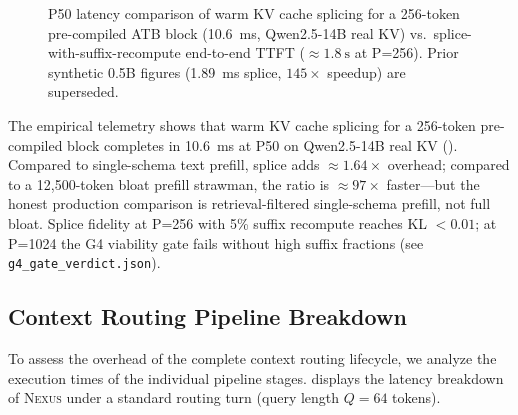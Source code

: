 \documentclass[conference,10pt]{IEEEtran}
\newcommand{\Nexus}{\textsc{Nexus}\xspace}
\begin{document}
\begin{figure}[h]
\centering
{}
\caption{P50 latency comparison of warm KV cache splicing for a 256-token pre-compiled ATB block (\SI{10.6}{\milli\second}, Qwen2.5-14B real KV) vs.\ splice-with-suffix-recompute end-to-end TTFT (\(\approx\!\SI{1.8}{\second}\) at P=256). Prior synthetic 0.5B figures (\SI{1.89}{\milli\second} splice, $145\times$ speedup) are superseded.}
\label{fig:latency_chart}
\end{figure}

The empirical telemetry shows that warm KV cache splicing for a 256-token pre-compiled block completes in \SI{10.6}{\milli\second} at P50 on Qwen2.5-14B real KV (). Compared to single-schema text prefill, splice adds \(\approx\!1.64\times\) overhead; compared to a 12,500-token bloat prefill strawman, the ratio is \(\approx\!97\times\) faster---but the honest production comparison is retrieval-filtered single-schema prefill, not full bloat. Splice fidelity at P=256 with 5\% suffix recompute reaches KL $<0.01$; at P=1024 the G4 viability gate fails without high suffix fractions (see \texttt{g4\_gate\_verdict.json}).

\subsection{Context Routing Pipeline Breakdown}
\label{subsec:eval-breakdown}

To assess the overhead of the complete context routing lifecycle, we analyze the execution times of the individual pipeline stages.  displays the latency breakdown of \Nexus under a standard routing turn (query length $Q = 64$ tokens).
\end{document}
